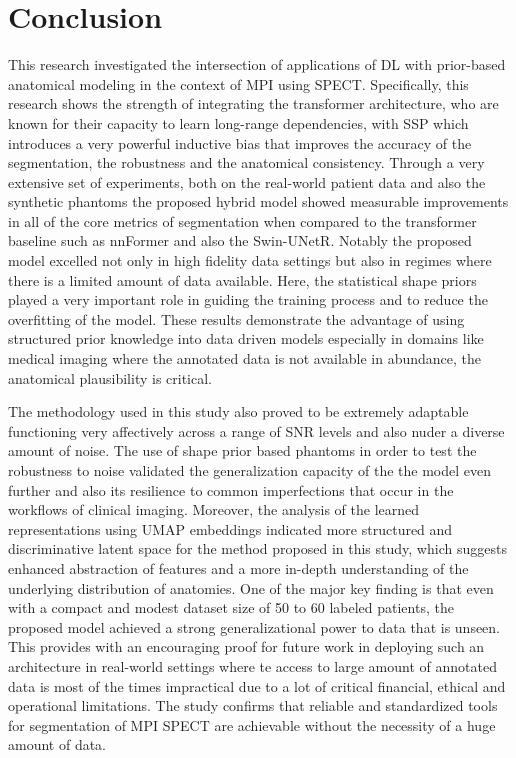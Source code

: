 \chapter{Conclusion}
\label{ch:conclusion}

This research investigated the intersection of applications of DL with prior-based anatomical modeling in the context of MPI using SPECT. Specifically, this research shows the strength of integrating the transformer architecture, who are known for their capacity to learn long-range dependencies, with SSP which introduces a very powerful inductive bias that improves the accuracy of the segmentation, the robustness and the anatomical consistency. Through a very extensive set of experiments, both on the real-world patient data and also the synthetic phantoms the proposed hybrid model showed measurable improvements in all of the core metrics of segmentation when compared to the transformer baseline such as nnFormer and also the Swin-UNetR. Notably the proposed model excelled not only in high fidelity data settings but also in regimes where there is a limited amount of data available. Here, the statistical shape priors played a very important role in guiding the training process and to reduce the overfitting of the model. These results demonstrate the advantage of using structured prior knowledge into data driven models especially in domains like medical imaging where the annotated data is not available in abundance, the anatomical plausibility is critical.

The methodology used in this study also proved to be extremely adaptable functioning very affectively across a range of SNR levels and also nuder a diverse amount of noise. The use of shape prior based phantoms in order to test the robustness to noise validated the generalization capacity of the the model even further and also its resilience to common imperfections that occur in the workflows of clinical imaging. Moreover, the analysis of the learned representations using UMAP embeddings indicated more structured and discriminative latent space for the method proposed in this study, which suggests enhanced abstraction of features and a more in-depth understanding of the underlying distribution of anatomies. One of the major key finding is that even with a compact and modest dataset size of 50 to 60 labeled patients, the proposed model achieved a strong generalizational power to data that is unseen. This provides with an encouraging proof for future work in deploying such an architecture in real-world settings where te access to large amount of annotated data is most of the times impractical due to a lot of critical financial, ethical and operational limitations. The study confirms that reliable and standardized tools for segmentation of MPI SPECT are achievable without the necessity of a huge amount of data.

